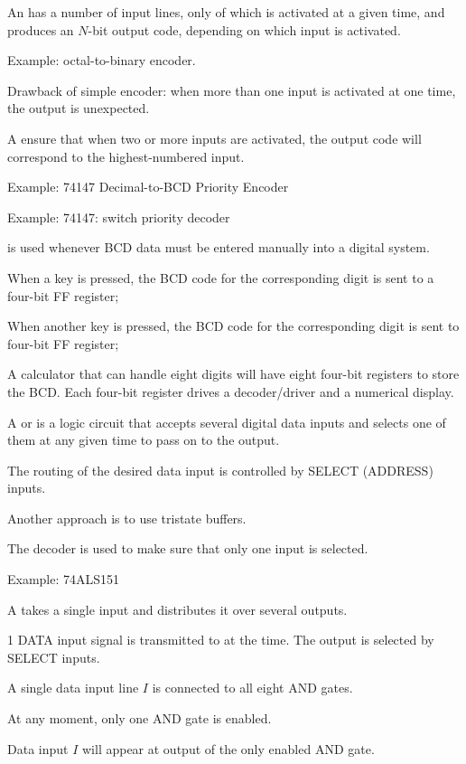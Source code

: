     \par An  has a number of input lines, only  of which is
    activated at a given time, and produces an $N$-bit output code, depending on
    which input is activated.
    \par Example: octal-to-binary encoder.
    \par Drawback of simple encoder: when more than one input is activated at one time,
      the output is unexpected.
    \par A  ensure that when two or more inputs are activated, the
    output code will correspond to the highest-numbered input.
    \par Example: 74147 Decimal-to-BCD Priority Encoder
  \par Example: 74147: switch priority decoder
    \par {} is used whenever BCD data must be entered manually into a
      digital system.
    \par When a key is pressed, the BCD code for the corresponding digit is sent to a
      four-bit FF register;
    \par When another key is pressed, the BCD code for the corresponding digit is sent to
       four-bit FF register;
    \par A calculator that can handle eight digits will have eight four-bit registers to
    store the BCD. Each four-bit register drives a decoder/driver and a numerical display. 

    \par A  or  is a logic circuit that accepts
      several digital data inputs and selects one of them at any given time to pass on to
      the output.
    \par The routing of the desired data input is controlled by SELECT (ADDRESS) inputs.
    \par Another approach is to use tristate buffers.
    \par The decoder is used to make sure that only one input is selected.
    \par Example: 74ALS151

    \par A  takes a single input and distributes it over several outputs.
    \par 1 DATA input signal is transmitted to  at the time. The output is
      selected by SELECT inputs.
    \par A single data input line $I$ is connected to all eight AND gates.
    \par At any moment, only one AND gate is enabled.
    \par Data input $I$ will appear at output of the only enabled AND gate.
